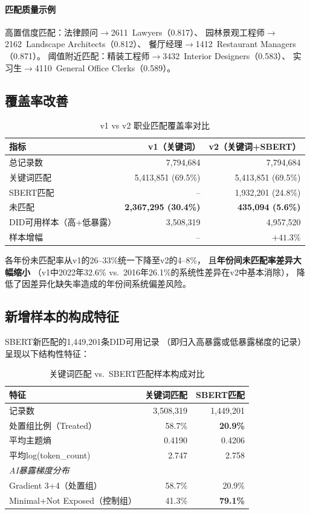 \documentclass[12pt,a4paper]{ctexart}
\begin{document}
\paragraph{匹配质量示例}
高置信度匹配：法律顾问$\to$2611~Lawyers（0.817）、
园林景观工程师$\to$2162~Landscape Architects（0.812）、
餐厅经理$\to$1412~Restaurant Managers（0.871）。
阈值附近匹配：精装工程师$\to$3432~Interior Designers（0.583）、
实习生$\to$4110~General Office Clerks（0.589）。

\subsection{覆盖率改善}

\begin{table}[h!]
\centering
\caption{v1 vs v2 职业匹配覆盖率对比}
\label{tab:v1v2_coverage}
\begin{tabular}{lrr}
\toprule
指标 & v1（关键词） & v2（关键词+SBERT） \\
\midrule
总记录数 & 7,794,684 & 7,794,684 \\
关键词匹配 & 5,413,851 (69.5\%) & 5,413,851 (69.5\%) \\
SBERT匹配 & -- & 1,932,201 (24.8\%) \\
未匹配 & \textbf{2,367,295 (30.4\%)} & \textbf{435,094 (5.6\%)} \\
\midrule
DID可用样本（高+低暴露） & 3,508,319 & 4,957,520 \\
样本增幅 & -- & $+41.3\%$ \\
\bottomrule
\end{tabular}
\end{table}

各年份未匹配率从v1的26--33\%统一下降至v2的4--8\%，
且\textbf{年份间未匹配率差异大幅缩小}
（v1中2022年32.6\% vs.\ 2016年26.1\%的系统性差异在v2中基本消除），
降低了因差异化缺失率造成的年份间系统偏差风险。

\subsection{新增样本的构成特征}

SBERT新匹配的1,449,201条DID可用记录
（即归入高暴露或低暴露梯度的记录）呈现以下结构性特征：

\begin{table}[h!]
\centering
\caption{关键词匹配 vs.\ SBERT匹配样本构成对比}
\label{tab:composition}
\begin{tabular}{lrr}
\toprule
特征 & 关键词匹配 & SBERT匹配 \\
\midrule
记录数 & 3,508,319 & 1,449,201 \\
处置组比例（Treated） & 58.7\% & \textbf{20.9\%} \\
平均主题熵 & 0.4190 & 0.4206 \\
平均log(token\_count) & 2.747 & 2.758 \\
\midrule
\multicolumn{3}{l}{\textit{AI暴露梯度分布}} \\
\quad Gradient 3+4（处置组） & 58.7\% & 20.9\% \\
\quad Minimal+Not Exposed（控制组） & 41.3\% & \textbf{79.1\%} \\
\bottomrule
\end{tabular}
\end{table}
\end{document}
